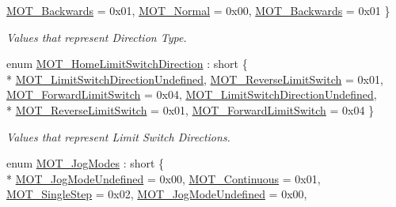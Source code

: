 \begin{DoxyCompactItemize}
\hyperlink{group___common_gga8e20138f47b000995f254ee6262f89d8a8e02e9b2bcad41ba25f2295821acd453}{M\+O\+T\+\_\+\+Backwards} = 0x01, 
\hyperlink{group___common_gga8e20138f47b000995f254ee6262f89d8a97191fb7d9f28808868a1e52c4365bd3}{M\+O\+T\+\_\+\+Normal} = 0x00, 
\hyperlink{group___common_gga8e20138f47b000995f254ee6262f89d8a8e02e9b2bcad41ba25f2295821acd453}{M\+O\+T\+\_\+\+Backwards} = 0x01
 \}\begin{DoxyCompactList}\small\item\em Values that represent Direction Type. \end{DoxyCompactList}
\item 
enum \hyperlink{group___common_ga31437a532fa07483a38ddb3098eddc81}{M\+O\+T\+\_\+\+Home\+Limit\+Switch\+Direction} \+: short \{ \\*
\hyperlink{group___common_gga31437a532fa07483a38ddb3098eddc81a75c76c6aaef82a17fbcba35ea3fc6b14}{M\+O\+T\+\_\+\+Limit\+Switch\+Direction\+Undefined}, 
\hyperlink{group___common_gga31437a532fa07483a38ddb3098eddc81a05bc8e3317131f8bb0b98db97d4559fa}{M\+O\+T\+\_\+\+Reverse\+Limit\+Switch} = 0x01, 
\hyperlink{group___common_gga31437a532fa07483a38ddb3098eddc81a15484a33245b22a47a0b86e801317976}{M\+O\+T\+\_\+\+Forward\+Limit\+Switch} = 0x04, 
\hyperlink{group___common_gga31437a532fa07483a38ddb3098eddc81a75c76c6aaef82a17fbcba35ea3fc6b14}{M\+O\+T\+\_\+\+Limit\+Switch\+Direction\+Undefined}, 
\\*
\hyperlink{group___common_gga31437a532fa07483a38ddb3098eddc81a05bc8e3317131f8bb0b98db97d4559fa}{M\+O\+T\+\_\+\+Reverse\+Limit\+Switch} = 0x01, 
\hyperlink{group___common_gga31437a532fa07483a38ddb3098eddc81a15484a33245b22a47a0b86e801317976}{M\+O\+T\+\_\+\+Forward\+Limit\+Switch} = 0x04
 \}\begin{DoxyCompactList}\small\item\em Values that represent Limit Switch Directions. \end{DoxyCompactList}
\item 
enum \hyperlink{group___common_ga009eac484778f2873f249c8562d94a93}{M\+O\+T\+\_\+\+Jog\+Modes} \+: short \{ \\*
\hyperlink{group___common_gga009eac484778f2873f249c8562d94a93a617613975eacad76fbbebef812ecd63b}{M\+O\+T\+\_\+\+Jog\+Mode\+Undefined} = 0x00, 
\hyperlink{group___common_gga009eac484778f2873f249c8562d94a93ad2fb6219129282462f7f204c5af85b19}{M\+O\+T\+\_\+\+Continuous} = 0x01, 
\hyperlink{group___common_gga009eac484778f2873f249c8562d94a93a48cd563aa46a46ac784f7b13be3be86c}{M\+O\+T\+\_\+\+Single\+Step} = 0x02, 
\hyperlink{group___common_gga009eac484778f2873f249c8562d94a93a617613975eacad76fbbebef812ecd63b}{M\+O\+T\+\_\+\+Jog\+Mode\+Undefined} = 0x00, 

\end{DoxyCompactItemize}
